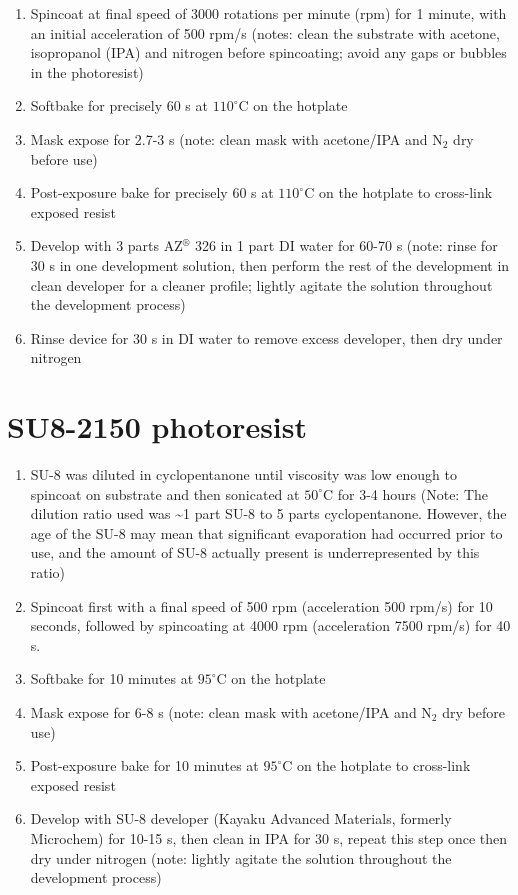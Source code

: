\documentclass[
  a4paper,
]{scrbook}
\begin{document}
\begin{enumerate}
\def\labelenumi{\arabic{enumi}.}
\item
  Spincoat at final speed of 3000 rotations per minute (rpm) for 1
  minute, with an initial acceleration of 500 rpm/s (notes: clean the
  substrate with acetone, isopropanol (IPA) and nitrogen before
  spincoating; avoid any gaps or bubbles in the photoresist)
\item
  Softbake for precisely 60 s at \(110^\circ\)C on the hotplate
\item
  Mask expose for 2.7-3 s (note: clean mask with acetone/IPA and N\(_2\)
  dry before use)
\item
  Post-exposure bake for precisely 60 s at \(110^\circ\)C on the
  hotplate to cross-link exposed resist
\item
  Develop with 3 parts AZ\(^\circledR\) 326 in 1 part DI water for 60-70
  s (note: rinse for 30 s in one development solution, then perform the
  rest of the development in clean developer for a cleaner profile;
  lightly agitate the solution throughout the development process)
\item
  Rinse device for 30 s in DI water to remove excess developer, then dry
  under nitrogen
\end{enumerate}

\hypertarget{su8-2150-photoresist}{%
\section{SU8-2150 photoresist}\label{su8-2150-photoresist}}

\begin{enumerate}
\def\labelenumi{\arabic{enumi}.}
\item
  SU-8 was diluted in cyclopentanone until viscosity was low enough to
  spincoat on substrate and then sonicated at \(50^\circ\)C for 3-4
  hours (Note: The dilution ratio used was \textasciitilde1 part SU-8 to
  5 parts cyclopentanone. However, the age of the SU-8 may mean that
  significant evaporation had occurred prior to use, and the amount of
  SU-8 actually present is underrepresented by this ratio)
\item
  Spincoat first with a final speed of 500 rpm (acceleration 500 rpm/s)
  for 10 seconds, followed by spincoating at 4000 rpm (acceleration 7500
  rpm/s) for 40 s.
\item
  Softbake for 10 minutes at \(95^\circ\)C on the hotplate
\item
  Mask expose for 6-8 s (note: clean mask with acetone/IPA and N\(_2\)
  dry before use)
\item
  Post-exposure bake for 10 minutes at \(95^\circ\)C on the hotplate to
  cross-link exposed resist
\item
  Develop with SU-8 developer (Kayaku Advanced Materials, formerly
  Microchem) for 10-15 s, then clean in IPA for 30 s, repeat this step
  once then dry under nitrogen (note: lightly agitate the solution
  throughout the development process)
\end{enumerate}
\end{document}
